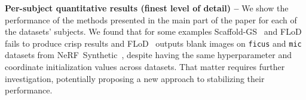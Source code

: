 \begin{table}[!t]
\begin{subtable}{\linewidth}
{    }
  \end{subtable}
  \caption[Quantitative results of \clog at the finest level of detail for each of the subjects in the used datatets]{\textbf{Per-subject quantitative results (finest level of detail) --}
    We show the performance of the methods presented in the main part of the paper
    for each of the datasets' subjects.
    We found that for some examples Scaffold-GS~\cite{lu2024scaffold} and
    FLoD~\cite{seo2024flod} fails to produce crisp results and
    FLoD~\cite{seo2024flod} outputs blank images on \texttt{ficus} and
    \texttt{mic} datasets from NeRF~Synthetic~\cite{mildenhall2020nerf}, despite
    having the same hyperparameter and coordinate initialization values across
    datasets.
    That matter requires further investigation, potentially proposing a new
    approach to stabilizing their performance.
  }
  \label{tab:clog-supp-quantitative}
\end{table}

